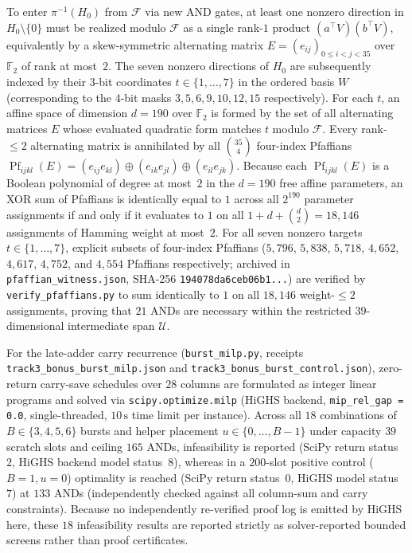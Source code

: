 \documentclass[11pt,a4paper]{article}
\theoremstyle{definition}
\theoremstyle{remark}
\begin{document}
To enter \(\pi^{-1}(H_0)\) from \(\mathcal{F}\) via new AND gates, at least one nonzero direction in \(H_0 \setminus \{0\}\) must be realized modulo \(\mathcal{F}\) as a single rank-\(1\) product \((a^\top V)(b^\top V)\), equivalently by a skew-symmetric alternating matrix \(E = (e_{ij})_{0 \le i < j < 35}\) over \(\mathbb{F}_2\) of rank at most~\(2\). The seven nonzero directions of \(H_0\) are subsequently indexed by their \(3\)-bit coordinates \(t \in \{1,\dots,7\}\) in the ordered basis \(W\) (corresponding to the \(4\)-bit masks \(3,5,6,9,10,12,15\) respectively). For each \(t\), an affine space of dimension \(d = 190\) over \(\mathbb{F}_2\) is formed by the set of all alternating matrices \(E\) whose evaluated quadratic form matches \(t\) modulo \(\mathcal{F}\). Every rank-\(\le 2\) alternating matrix is annihilated by all \(\binom{35}{4}\) four-index Pfaffians \(\operatorname{Pf}_{ijkl}(E) = (e_{ij} e_{kl}) \oplus (e_{ik} e_{jl}) \oplus (e_{il} e_{jk})\). Because each \(\operatorname{Pf}_{ijkl}(E)\) is a Boolean polynomial of degree at most~\(2\) in the \(d = 190\) free affine parameters, an XOR sum of Pfaffians is identically equal to \(1\) across all \(2^{190}\) parameter assignments if and only if it evaluates to \(1\) on all \(1 + d + \binom{d}{2} = 18{,}146\) assignments of Hamming weight at most~\(2\). For all seven nonzero targets \(t \in \{1,\dots,7\}\), explicit subsets of four-index Pfaffians (\(5{,}796\), \(5{,}838\), \(5{,}718\), \(4{,}652\), \(4{,}617\), \(4{,}752\), and \(4{,}554\) Pfaffians respectively; archived in \texttt{pfaffian\_witness.json}, SHA-256 \texttt{194078da\allowbreak 6ceb06b1...}) are verified by \texttt{verify\_pfaffians.py} to sum identically to \(1\) on all \(18{,}146\) weight-\(\le 2\) assignments, proving that \(21\) ANDs are necessary within the restricted \(39\)-dimensional intermediate span \(\mathcal{U}\).

For the late-adder carry recurrence (\texttt{burst\_\allowbreak milp.py}, receipts \texttt{track3\_\allowbreak bonus\_\allowbreak burst\_\allowbreak milp.json} and \texttt{track3\_\allowbreak bonus\_\allowbreak burst\_\allowbreak control.json}), zero-return carry-save schedules over \(28\) columns are formulated as integer linear programs and solved via \texttt{scipy.\allowbreak optimize.\allowbreak milp} (HiGHS backend, \texttt{mip\_\allowbreak rel\_\allowbreak gap = 0.0}, single-threaded, \(10\,\mathrm{s}\) time limit per instance). Across all \(18\) combinations of \(B \in \{3,4,5,6\}\) bursts and helper placement \(u \in \{0,\dots,B-1\}\) under capacity \(39\) scratch slots and ceiling \(165\) ANDs, infeasibility is reported (SciPy return status~\(2\), HiGHS backend model status~\(8\)), whereas in a \(200\)-slot positive control (\(B=1, u=0\)) optimality is reached (SciPy return status~\(0\), HiGHS model status~\(7\)) at \(133\) ANDs (independently checked against all column-sum and carry constraints). Because no independently re-verified proof log is emitted by HiGHS here, these \(18\) infeasibility results are reported strictly as solver-reported bounded screens rather than proof certificates.
\end{document}
